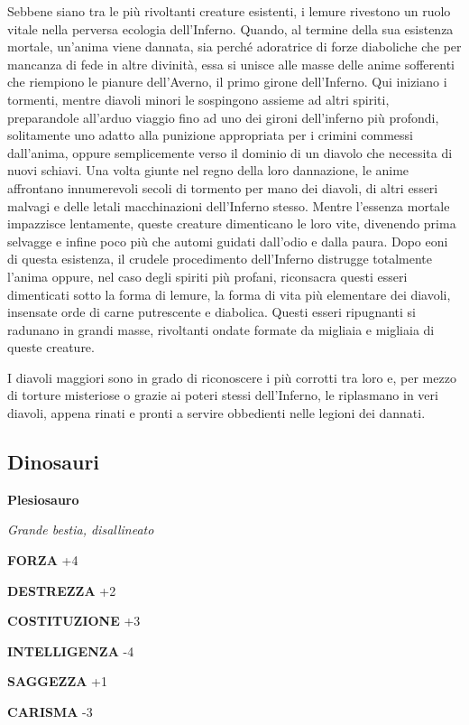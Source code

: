 \begin{multicols}{2}
	Sebbene siano tra le più rivoltanti creature esistenti, i lemure rivestono un ruolo vitale nella perversa ecologia dell'Inferno. Quando, al termine della sua esistenza mortale, un'anima viene dannata, sia perché adoratrice di forze diaboliche che per mancanza di fede in altre divinità, essa si unisce alle masse delle anime sofferenti che riempiono le pianure dell'Averno, il primo girone dell'Inferno. Qui iniziano i tormenti, mentre diavoli minori le sospingono assieme ad altri spiriti, preparandole all'arduo viaggio fino ad uno dei gironi dell'inferno più profondi, solitamente uno adatto alla punizione appropriata per i crimini commessi dall'anima, oppure semplicemente verso il dominio di un diavolo che necessita di nuovi schiavi. Una volta giunte nel regno della loro dannazione, le anime affrontano innumerevoli secoli di tormento per mano dei diavoli, di altri esseri malvagi e delle letali macchinazioni dell'Inferno stesso. Mentre l'essenza mortale impazzisce lentamente, queste creature dimenticano le loro vite, divenendo prima selvagge e infine poco più che automi guidati dall'odio e dalla paura. Dopo eoni di questa esistenza, il crudele procedimento dell'Inferno distrugge totalmente l'anima oppure, nel caso degli spiriti più profani, riconsacra questi esseri dimenticati sotto la forma di lemure, la forma di vita più elementare dei diavoli, insensate orde di carne putrescente e diabolica. Questi esseri ripugnanti si radunano in grandi masse, rivoltanti ondate formate da migliaia e migliaia di queste creature.

	I diavoli maggiori sono in grado di riconoscere i più corrotti tra loro e, per mezzo di torture misteriose o grazie ai poteri stessi dell'Inferno, le riplasmano in veri diavoli, appena rinati e pronti a servire obbedienti nelle legioni dei dannati.


	\subsection{Dinosauri}

	\medskip{}\textbf{Plesiosauro}

	\textit{Grande bestia, disallineato}

	\textbf{FORZA} +4

	\textbf{DESTREZZA} +2

	\textbf{COSTITUZIONE} +3

	\textbf{INTELLIGENZA} -4

	\textbf{SAGGEZZA} +1

	\textbf{CARISMA} -3


\end{multicols}
